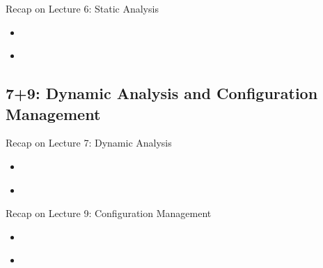 \begin{frame}{Recap on Lecture 6: Static Analysis}
	\begin{fancycolumns}
		\begin{note}{}
			\begin{itemize}
				\item 
			\end{itemize}
		\end{note}
		\nextcolumn
		\begin{note}{}
			\begin{itemize}
				\item 
			\end{itemize}
		\end{note}
	\end{fancycolumns}
\end{frame}

\subsection{7+9: Dynamic Analysis and Configuration Management}
\begin{frame}{Recap on Lecture 7: Dynamic Analysis}
	\begin{fancycolumns}
		\begin{note}{}
			\begin{itemize}
				\item 
			\end{itemize}
		\end{note}
		\nextcolumn
		\begin{note}{}
			\begin{itemize}
				\item 
			\end{itemize}
		\end{note}
	\end{fancycolumns}
\end{frame}

\begin{frame}{Recap on Lecture 9: Configuration Management}
	\begin{fancycolumns}
		\begin{note}{}
			\begin{itemize}
				\item 
			\end{itemize}
		\end{note}
		\nextcolumn
		\begin{note}{}
			\begin{itemize}
				\item 
			\end{itemize}
		\end{note}
	\end{fancycolumns}
\end{frame}

